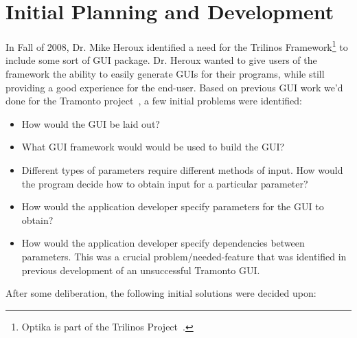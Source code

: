 \section{Initial Planning and Development}
In Fall of 2008, Dr. Mike Heroux identified a need for
the Trilinos Framework\footnote{Optika is part of the Trilinos Project~\cite{1089021}.} to include some sort of GUI package. Dr. Heroux wanted 
to give users of the framework the ability to easily generate GUIs for their
programs, while still providing a good experience for the end-user. Based on
previous GUI work we'd done for the Tramonto project~\cite{Tramonto}, a few initial problems were
identified:

	\begin{itemize}
		\item How would the GUI be laid out?
		\item What GUI framework would would be used to build the GUI?
		\item Different types of parameters require different methods of input.
			How would the program decide how to obtain input for a particular
			parameter?
		\item How would the application developer specify parameters for the
			GUI to obtain?
		\item How would the application developer specify dependencies between
		parameters. This was a crucial problem/needed-feature that was identified in
		previous development of an unsuccessful Tramonto GUI.
	\end{itemize}

After some deliberation, the following initial solutions were decided upon:

